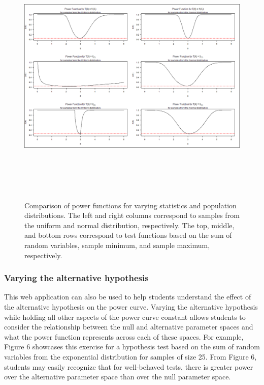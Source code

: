 \documentclass{TISE}
\begin{document}
\begin{figure}[H]
	\centering
	\includegraphics[height=5in, width=\linewidth]{fig5.png}
	\caption{Comparison of power functions for varying statistics and population distributions. The left and right columns correspond to samples from the uniform and normal distribution, respectively. The top, middle, and bottom rows correspond to test functions based on the sum of random variables, sample minimum, and sample maximum, respectively.}
\end{figure}

\subsubsection{Varying the alternative hypothesis}

This web application can also be used to help students understand the effect of the alternative hypothesis on the power curve. Varying the alternative hypothesis while holding all other aspects of the power curve constant allows students to consider the relationship between the null and alternative parameter spaces and what the power function represents across each of these spaces. For example, Figure 6 showcases this exercise for a hypothesis test based on the sum of random variables from the exponential distribution for samples of size 25. From Figure 6, students may easily recognize that for well-behaved tests, there is greater power over the alternative parameter space than over the null parameter space. 
\end{document}

